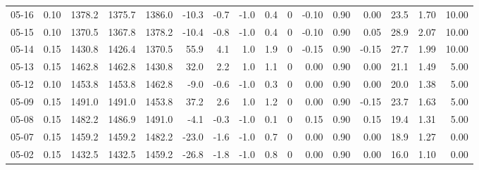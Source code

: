 \begin{threeparttable}
{\begin{tabular}{lrrrrrrrrrrrrrrr}
  05-16 &     0.10 & 1378.2 & 1375.7 & 1386.0 &      -10.3 &           -0.7 &                     -1.0 &                 0.4 &              0 &      -0.10 &      0.90 &           0.00 &             23.5 &            1.70 &                  10.00 \\
  05-15 &     0.10 & 1370.5 & 1367.8 & 1378.2 &      -10.4 &           -0.8 &                     -1.0 &                 0.4 &              0 &      -0.10 &      0.90 &           0.05 &             28.9 &            2.07 &                  10.00 \\
  05-14 &     0.15 & 1430.8 & 1426.4 & 1370.5 &       55.9 &            4.1 &                      1.0 &                 1.9 &              0 &      -0.15 &      0.90 &          -0.15 &             27.7 &            1.99 &                  10.00 \\
  05-13 &     0.15 & 1462.8 & 1462.8 & 1430.8 &       32.0 &            2.2 &                      1.0 &                 1.1 &              0 &       0.00 &      0.90 &           0.00 &             21.1 &            1.49 &                   5.00 \\
  05-12 &     0.10 & 1453.8 & 1453.8 & 1462.8 &       -9.0 &           -0.6 &                     -1.0 &                 0.3 &              0 &       0.00 &      0.90 &           0.00 &             20.0 &            1.38 &                   5.00 \\
  05-09 &     0.15 & 1491.0 & 1491.0 & 1453.8 &       37.2 &            2.6 &                      1.0 &                 1.2 &              0 &       0.00 &      0.90 &          -0.15 &             23.7 &            1.63 &                   5.00 \\
  05-08 &     0.15 & 1482.2 & 1486.9 & 1491.0 &       -4.1 &           -0.3 &                     -1.0 &                 0.1 &              0 &       0.15 &      0.90 &           0.15 &             19.4 &            1.31 &                   5.00 \\
  05-07 &     0.15 & 1459.2 & 1459.2 & 1482.2 &      -23.0 &           -1.6 &                     -1.0 &                 0.7 &              0 &       0.00 &      0.90 &           0.00 &             18.9 &            1.27 &                   0.00 \\
  05-02 &     0.15 & 1432.5 & 1432.5 & 1459.2 &      -26.8 &           -1.8 &                     -1.0 &                 0.8 &              0 &       0.00 &      0.90 &           0.00 &             16.0 &            1.10 &                   0.00 \\

\end{tabular}}
\end{threeparttable}

